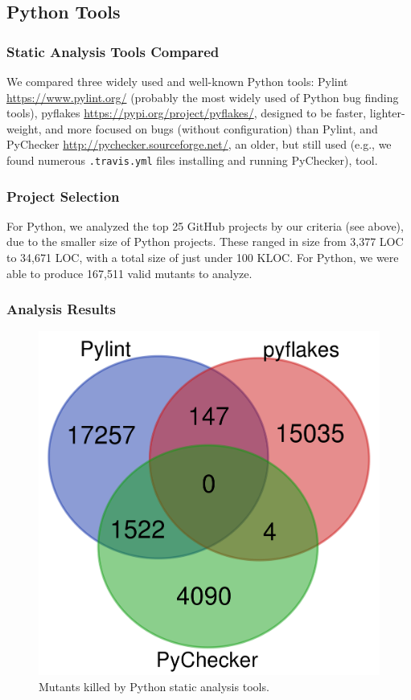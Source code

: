 \subsection{Python Tools}

\subsubsection{Static Analysis Tools Compared}

We compared three widely used and well-known Python tools:  Pylint \url{https://www.pylint.org/} (probably the most widely used of Python bug finding tools), pyflakes \url{https://pypi.org/project/pyflakes/}, designed to be faster, lighter-weight, and more focused on bugs (without configuration) than Pylint, and PyChecker \url{http://pychecker.sourceforge.net/}, an older, but still used (e.g., we found numerous {\tt .travis.yml} files installing and running PyChecker), tool.

\subsubsection{Project Selection}

For Python, we analyzed the top 25 GitHub projects by our criteria (see above), due to the smaller size of Python projects.  These ranged in size from 3,377 LOC to 34,671 LOC, with a total size of just under 100 KLOC.  For Python, we were able to produce 167,511 valid mutants to analyze.

\subsubsection{Analysis Results}


\begin{figure}
  \includegraphics[width=0.4\columnwidth]{python.png}
  \caption{Mutants killed by Python static analysis tools.}
  \label{fig:pythonvenn}
\end{figure}

